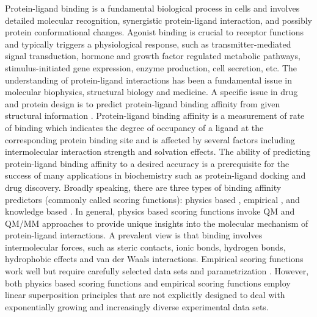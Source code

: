 \documentclass[10pt]{article}
\begin{document}
Protein-ligand binding is a fundamental  biological process in cells and involves detailed molecular recognition, synergistic protein-ligand interaction, and possibly protein conformational changes.  Agonist binding is crucial to receptor  functions and typically triggers a physiological response, such as transmitter-mediated signal transduction, hormone and growth factor regulated metabolic pathways,  stimulus-initiated gene expression, enzyme production, cell secretion, etc.  The understanding of protein-ligand interactions has been a fundamental issue in molecular biophysics, structural biology and medicine. A specific issue in drug and protein design is to predict protein-ligand binding affinity from given structural information   \cite{Kuntz:1982,DesJarlais:1986,Goodsell:1990,Jorgensen:1991, Kollman:2000ACR,gilson1997statistical, Gilson:2007}.
Protein-ligand binding affinity is a measurement of rate of binding which indicates the degree of occupancy of a ligand at the corresponding protein binding site and is affected by several factors including intermolecular interaction strength and solvation effects. The ability of predicting protein-ligand binding affinity to a desired accuracy is a prerequisite for the success of many applications in biochemistry such as protein-ligand docking and drug discovery. 
Broadly speaking, there are three types of binding affinity predictors (commonly called scoring functions): physics based \cite{Ortiz:1995,Yin:2008}, empirical \cite{Zheng:2015LISA,Verkhivker:1995PLP, Eldridge:1997,WangRenXiao:2002,Zheng:2013MoveableType,PMFScore:1999, DrugScore:2005,ITScore:2006}, and knowledge based  \cite{HongjianLi:2014RF,Sarah:2011,Ashtawy:2012}.  In general, physics based scoring functions invoke QM and QM/MM approaches \cite{CHARMM22, AMBER15} to provide unique insights into the molecular mechanism of protein-ligand interactions. 
A prevalent view is that binding involves intermolecular forces, such as steric contacts, ionic bonds, hydrogen bonds, hydrophobic effects and van der Waals interactions. 
Empirical scoring functions work well but require carefully selected data sets and parametrization \cite{Zheng:2015LISA,Verkhivker:1995PLP, Eldridge:1997,WangRenXiao:2002}. However, both  physics based scoring functions and empirical scoring functions employ linear superposition principles that are  not explicitly designed to deal with exponentially  growing and increasingly diverse  experimental data sets. 
\end{document}
